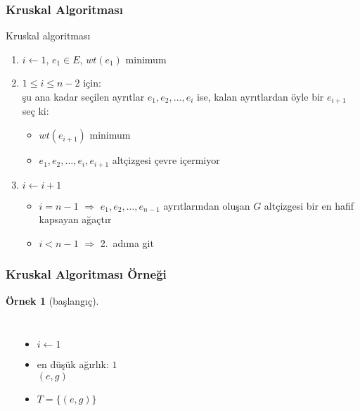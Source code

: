\documentclass[dvipsnames]{beamer}
\theoremstyle{definition}
\theoremstyle{example}
\newtheorem{ornek}[theorem]{Örnek}
\theoremstyle{plain}
\begin{document}
\begin{frame}
  \frametitle{Kruskal Algoritması}

  \begin{block}{Kruskal algoritması}
    \begin{enumerate}
      \item $i \leftarrow 1$, $e_1 \in E$, $wt(e_1)$ minimum

      \pause
      \item $1 \leq i \leq n-2$ için:\\
        şu ana kadar seçilen ayrıtlar $e_1,e_2,\dots,e_i$ ise, kalan ayrıtlardan
        öyle bir $e_{i+1}$ seç ki:
      \begin{itemize}
        \item $wt(e_{i+1})$ minimum
        \item $e_1,e_2,\dots,e_i,e_{i+1}$ altçizgesi çevre içermiyor
      \end{itemize}

      \pause
      \item $i \leftarrow i+1$
      \begin{itemize}
        \item $i=n-1$ $\Rightarrow$ $e_1,e_2,\dots,e_{n-1}$ ayrıtlarından oluşan
          $G$ altçizgesi bir en hafif kapsayan ağaçtır
        \item $i<n-1$ $\Rightarrow$ 2.~adıma git
      \end{itemize}
    \end{enumerate}
  \end{block}
\end{frame}

\begin{frame}
  \frametitle{Kruskal Algoritması Örneği}

  \begin{ornek}[başlangıç]
    \begin{columns}
      \begin{center}
      \end{center}

      \pause
      \begin{itemize}
        \item $i \leftarrow 1$
        \item en düşük ağırlık: $1$\\
          $(e,g)$

        \pause
        \item $T = \{ (e,g) \}$
      \end{itemize}
    \end{columns}
  \end{ornek}
\end{frame}
\end{document}

